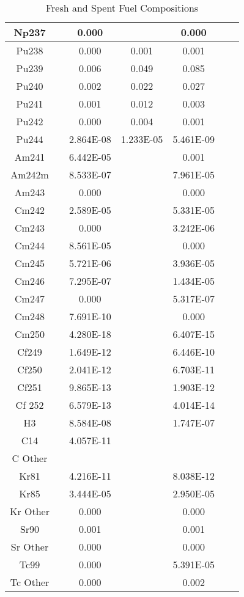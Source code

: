 \begin{table}[h]
{\begin{tabular}{|c|c|c|c|c|c|c|}
		 Np237	 & 	 	& 	0.000 & 	 	 & 	0.000 \\ \hline 
		 Pu238	 & 	 	& 	0.000 & 	0.001 & 	0.001 \\ \hline 
		 Pu239	 & 	 	& 	0.006 & 	0.049 & 	0.085 \\ \hline 
		 Pu240	 & 	 	& 	0.002 & 	0.022 & 	0.027 \\ \hline 
		 Pu241	 & 	 	& 	0.001 & 	0.012 & 	0.003 \\ \hline 
		 Pu242	 & 	 	& 	0.000 & 	0.004 & 	0.001 \\ \hline 
		 Pu244	 & 	 	& 	2.864E-08 & 	1.233E-05 & 	5.461E-09 \\ \hline 
		 Am241	 & 	 	& 	6.442E-05 & 	 	 & 	0.001 \\ \hline 
		 Am242m	 & 	 	& 	8.533E-07 & 	 	 & 	7.961E-05 \\ \hline 
		 Am243	 & 	 	& 	0.000 & 	 	 & 	0.000 \\ \hline 
		 Cm242	 & 	 	& 	2.589E-05 & 	 	 & 	5.331E-05 \\ \hline 
		 Cm243	 & 	 	& 	0.000 & 	 	 & 	3.242E-06 \\ \hline 
		 Cm244	 & 	 	& 	8.561E-05 & 	 	 & 	0.000 \\ \hline 
		 Cm245	 & 	 	& 	5.721E-06 & 	 	 & 	3.936E-05 \\ \hline 
		 Cm246	 & 	 	& 	7.295E-07 & 	 	 & 	1.434E-05 \\ \hline 
		 Cm247	 & 	 	& 	0.000 & 	 	 & 	5.317E-07 \\ \hline 
		 Cm248	 & 	 	& 	7.691E-10 & 	 	 & 	0.000 \\ \hline 
		 Cm250	 & 	 	& 	4.280E-18 & 	 	 & 	6.407E-15 \\ \hline 
		 Cf249	 & 	 	& 	1.649E-12 & 	 	 & 	6.446E-10 \\ \hline 
		 Cf250	 & 	 	& 	2.041E-12 & 	 	 & 	6.703E-11 \\ \hline 
		 Cf251	 & 	 	& 	9.865E-13 & 	 	 & 	1.903E-12 \\ \hline 
		 Cf 252	 & 	 	& 	6.579E-13 & 	 	 & 	4.014E-14 \\ \hline 
		 H3	 & 	 	& 	8.584E-08 & 	 	 & 	1.747E-07 \\ \hline 
		 C14	 & 	 	& 	4.057E-11 & 	 	 & 	 	 \\ \hline 
		 C Other	 & 	 	& 	 	 & 	 	 & 	 	 \\ \hline 
		 Kr81	 & 	 	& 	4.216E-11 & 	 	 & 	8.038E-12 \\ \hline 
		 Kr85	 & 	 	& 	3.444E-05 & 	 	 & 	2.950E-05 \\ \hline 
		 Kr Other	 & 	 	& 	0.000 & 	 	 & 	0.000 \\ \hline 
		 Sr90	 & 	 	& 	0.001 & 	 	 & 	0.001 \\ \hline 
		 Sr Other	 & 	 	& 	0.000 & 	 	 & 	0.000 \\ \hline 
		 Tc99	 & 	 	& 	0.000 & 	 	 & 	5.391E-05 \\ \hline 
		 Tc Other	 & 	 	& 	0.000 & 	 	 & 	0.002 \\ \hline 

		\end{tabular}}
		\caption{Fresh and Spent Fuel Compositions}
		\label{tab:comp}
\end {table}
